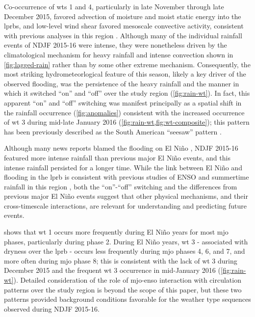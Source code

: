 \documentclass{ametsoc}
\begin{document}
Co-occurrence of \glspl{wt} 1 and 4, particularly in late November through late December 2015, favored advection of moisture and moist static energy into the \glspl{lprb}, and low-level wind shear favored mesoscale convective activity, consistent with previous analyses in this region \citep{Velasco1987,Marengo2004,Saulo2007,Salio2007}.
Although many of the individual rainfall events of NDJF 2015-16 were intense, they were nonetheless driven by the climatological mechanism for heavy rainfall and intense convection shown in \cref{fig:lagged-rain} rather than by some other extreme mechanism.
Consequently, the most striking hydrometeorlogical feature of this season, likely a key driver of the observed flooding, was the persistence of the heavy rainfall and the manner in which it switched ``on'' and ``off'' over the study region (\cref{fig:rain-wt}).
In fact, this apparent ``on'' and ``off'' switching was manifest principally as a spatial shift in the rainfall occurrence (\cref{fig:anomalies}) consistent with the increased occurrence of \gls{wt} 3 during mid-late January 2016 (\cref{fig:rain-wt,fig:wt-composite}); this pattern has been previously described as the South American ``seesaw'' pattern \citep{Nogues-Paegle1997}.

Although many news reports blamed the flooding on El Ni\~{n}o \citep{BBC2015}, NDJF 2015-16 featured more intense rainfall than previous major El Ni\~no events, and this intense rainfall persisted for a longer time.
While the link between El Ni\~{n}o and flooding in the \gls{lprb} is consistent with previous studies of ENSO and summertime rainfall in this region \citep{Velasco1987,Grimm2000,Salio2002,Grimm2003,Carvalho2004,Grimm2009a,Bravo2011}, both the ``on''-``off'' switching and the differences from previous major El Ni\~{n}o events suggest that other physical mechanisms, and their cross-timescale interactions, are relevant for understanding and predicting future events.

 shows that \gls{wt} 1 occurs more frequently during El Ni\~{n}o years for most \gls{mjo} phases, particularly during phase 2.
During El Ni\~no years, \gls{wt} 3 - associated with dryness over the \gls{lprb} - occurs less frequently during \gls{mjo} phases 4, 6, and 7, and more often during \gls{mjo} phase 8; this is consistent with the lack of \gls{wt} 3 during December 2015 and the frequent \gls{wt} 3 occurrence in mid-January 2016 (\cref{fig:rain-wt}).
Detailed consideration of the role of \gls{mjo}-\gls{enso} interaction with circulation patterns over the study region is beyond the scope of this paper, but these two patterns provided background conditions favorable for the weather type sequences observed during NDJF 2015-16.
\end{document}
